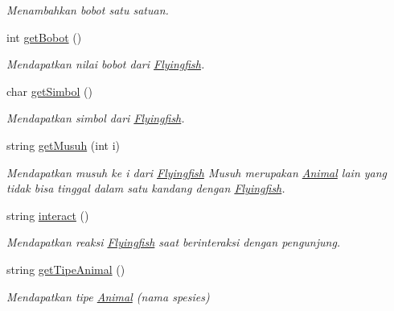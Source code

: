 \begin{DoxyCompactItemize}
\begin{DoxyCompactList}\small\item\em Menambahkan bobot satu satuan. \end{DoxyCompactList}\item 
int \hyperlink{classFlyingfish_af2ece72f2ec7d09b45c47c7f20f8055f}{get\-Bobot} ()
\begin{DoxyCompactList}\small\item\em Mendapatkan nilai bobot dari \hyperlink{classFlyingfish}{Flyingfish}. \end{DoxyCompactList}\item 
char \hyperlink{classFlyingfish_ade9b5e0c9cbf6e129fef444828a39093}{get\-Simbol} ()
\begin{DoxyCompactList}\small\item\em Mendapatkan simbol dari \hyperlink{classFlyingfish}{Flyingfish}. \end{DoxyCompactList}\item 
string \hyperlink{classFlyingfish_a1b0c4e8ec03fed736df6bf8d21e6c5b4}{get\-Musuh} (int i)
\begin{DoxyCompactList}\small\item\em Mendapatkan musuh ke i dari \hyperlink{classFlyingfish}{Flyingfish} Musuh merupakan \hyperlink{classAnimal}{Animal} lain yang tidak bisa tinggal dalam satu kandang dengan \hyperlink{classFlyingfish}{Flyingfish}. \end{DoxyCompactList}\item 
string \hyperlink{classFlyingfish_a80a6975d988630970c7456c72c37591f}{interact} ()
\begin{DoxyCompactList}\small\item\em Mendapatkan reaksi \hyperlink{classFlyingfish}{Flyingfish} saat berinteraksi dengan pengunjung. \end{DoxyCompactList}\item 
string \hyperlink{classFlyingfish_a8e4bdebd6174a385ae894061b53b7cb1}{get\-Tipe\-Animal} ()
\begin{DoxyCompactList}\small\item\em Mendapatkan tipe \hyperlink{classAnimal}{Animal} (nama spesies) \end{DoxyCompactList}\end{DoxyCompactItemize}

